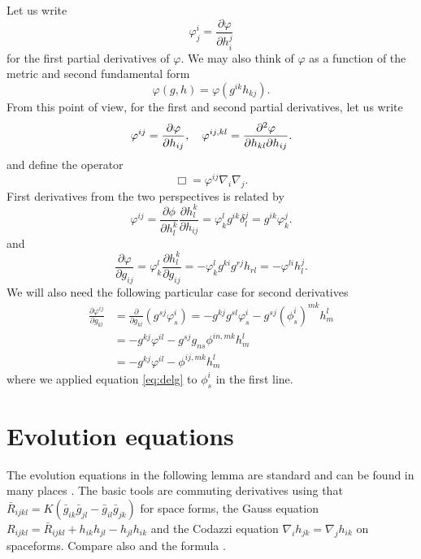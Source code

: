 \documentclass{amsart}
\theoremstyle{definition}
\theoremstyle{remark}
\numberwithin{equation}{section}
\begin{document}
Let us write
\[
\varphi^{i}_{j} = \frac{\partial \varphi}{\partial h^{j}_{i}}
\]
for the first partial derivatives of \(\varphi\). We may also think of \(\varphi\) as a function of the metric and second fundamental form
\[
\varphi(g, h) = \varphi(g^{ik} h_{kj}).
\]
From this point of view, for the first and second partial derivatives, let us write
\[
\varphi^{ij} = \frac{\partial\varphi}{\partial h_{ij}}, \quad \varphi^{ij,kl} = \frac{\partial^2\varphi}{\partial h_{kl} \partial h_{ij}}.
\]
and define the operator
\[
\Box = \varphi^{ij} \nabla_i \nabla_j.
\]
First derivatives from the two perspectives is related by
\begin{equation}
\label{eq:delh}
\varphi^{ij} = \frac{\partial \phi}{\partial h_l^k} \frac{\partial h_l^k}{\partial h_{ij}} = \varphi^l_k g^{ik} \delta^j_l = g^{ik} \varphi^j_k.
\end{equation}
and
\begin{equation}
\label{eq:delg}
\frac{\partial\varphi}{\partial g_{ij}} = \varphi^{l}_{k} \frac{\partial h^{k}_{l}}{\partial g_{ij}} = -\varphi^{l}_{k} g^{ki} g^{rj} h_{rl} = -\varphi^{li}h^{j}_{l}.
\end{equation}
We will also need the following particular case for second derivatives
\begin{equation}
\label{eq:delhdelg}
\begin{split}
\frac{\partial \varphi^{ij}}{\partial g_{kl}} &= \frac{\partial}{\partial g_{kl}} \left(g^{sj} \varphi^{i}_{s} \right) = - g^{kj}g^{sl} \varphi^{i}_{s} - g^{sj} (\phi^i_s)^{mk} h^l_m \\
&= - g^{kj} \varphi^{il} - g^{sj} g_{ns} \phi^{in,mk} h^l_m \\
&= - g^{kj} \varphi^{il} - \phi^{ij,mk} h^l_m
\end{split}
\end{equation}
where we applied equation \eqref{eq:delg} to \(\phi^i_s\) in the first line.

\section{Evolution equations}

The evolution equations in the following lemma are standard and can be found in many places \cite{MR1316556, MR1100812, MR1296393, MR1480081}. The basic tools are commuting derivatives using that \(\bar{R}_{ijkl} = K(\bar{g}_{ik}\bar{g}_{jl} - \bar{g}_{il}\bar{g}_{jk})\) for space forms, the Gauss equation \(R_{ijkl} = \bar{R}_{ijkl} + h_{ik}h_{jl} - h_{jl}h_{ik}\) and the Codazzi equation \(\nabla_i h_{jk} = \nabla_j h_{ik}\) on spaceforms. Compare also \cite[p.~94-95]{Gerhardt:/2006} and the formula \cite[eq.~(6.17)]{Gerhardt:01/1996}.
\end{document}
